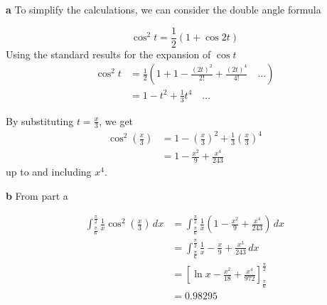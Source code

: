 \documentclass[
  a4paper,
]{report}
\begin{document}
\begin{tcolorbox}[enhanced jigsaw, leftrule=.75mm, left=2mm, opacitybacktitle=0.6, breakable, bottomtitle=1mm, colframe=quarto-callout-tip-color-frame, opacityback=0, colbacktitle=quarto-callout-tip-color!10!white, toptitle=1mm, arc=.35mm, titlerule=0mm, coltitle=black, rightrule=.15mm, bottomrule=.15mm, toprule=.15mm, title={Solution}, colback=white]

\textbf{a} To simplify the calculations, we can consider the double
angle formula

\[\cos^2 t = \frac{1}{2}(1+\cos 2t)\] Using the standard results for the
expansion of \(\cos t\) \begin{equation*}
\begin{split}
\cos^2 t &= \frac{1}{2}(1+1-\frac{(2t)^2}{2!}+\frac{(2t)^4}{4!}\quad ...) \\
&=1-t^2+\frac{1}{3}t^4\quad ...
\end{split}
\end{equation*}

By substituting \(t=\frac{x}{3}\), we get \begin{equation*}
\begin{split}
\cos^2 \left(\frac{x}{3}\right) &= 1-\left(\frac{x}{3}\right)^2+\frac{1}{3}\left(\frac{x}{3}\right)^4 \\
&=1-\frac{x^2}{9}+\frac{x^4}{243}
\end{split}
\end{equation*} up to and including \(x^4\).

\textbf{b} From part a

\begin{equation*}
\begin{split}
\int_{\frac{\pi}{6}}^{\frac{\pi}{2}} \frac{1}{x} \cos ^2\left(\frac{x}{3}\right) \,dx &= \int_{\frac{\pi}{6}}^{\frac{\pi}{2}} \frac{1}{x} \left(1-\frac{x^2}{9}+\frac{x^4}{243}\right) \,dx \\
&= \int_{\frac{\pi}{6}}^{\frac{\pi}{2}} \frac{1}{x} -\frac{x}{9}+\frac{x^3}{243} \,dx \\
&=\left[ \ln x - \frac{x^2}{18} + \frac{x^4}{972}\right]_{\frac{\pi}{6}}^{\frac{\pi}{2}} \\
&= 0.98295 
\end{split}
\end{equation*}

\end{tcolorbox}
\end{document}
